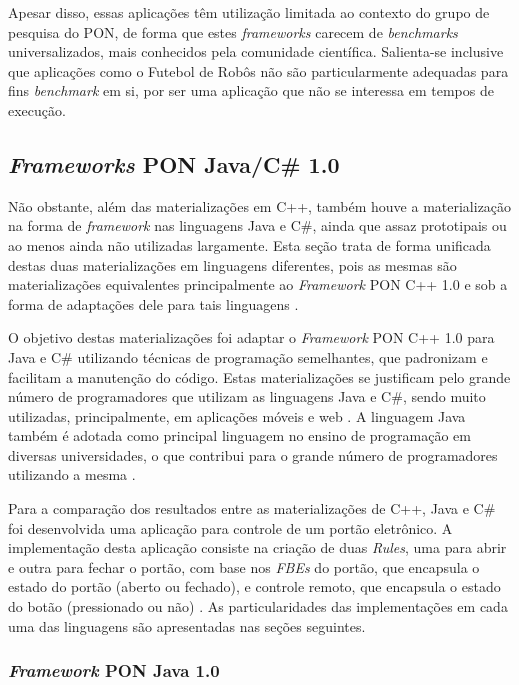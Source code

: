 Apesar disso, essas aplicações têm utilização limitada ao contexto do grupo de
pesquisa do PON, de forma que estes \textit{frameworks} carecem de
\textit{benchmarks} universalizados, mais conhecidos pela comunidade científica.
Salienta-se inclusive que aplicações como o Futebol de Robôs não são
particularmente adequadas para fins \textit{benchmark} em si, por ser uma
aplicação que não se interessa em tempos de execução.

\subsection{\textit{Frameworks} PON Java/C\# 1.0}\label{sec:csharp_java}

Não obstante, além das materializações em C++, também houve a materialização na
forma de \textit{framework} nas linguagens Java e C\#, ainda que assaz
prototipais ou ao menos ainda não utilizadas largamente. Esta seção trata de
forma unificada destas duas materializações em linguagens diferentes, pois as
mesmas são materializações equivalentes principalmente ao \textit{Framework} PON
C++ 1.0 e sob a forma de adaptações dele para tais linguagens
\cite{henzen_2015}.

O objetivo destas materializações foi adaptar o \textit{Framework} PON C++ 1.0
para Java e C\# utilizando técnicas de programação semelhantes, que padronizam e
facilitam a manutenção do código. Estas materializações se justificam pelo
grande número de programadores que utilizam as linguagens Java e C\#, sendo
muito utilizadas, principalmente, em aplicações móveis e web \cite{henzen_2015}.
A linguagem Java também é adotada como principal linguagem no ensino de
programação em diversas universidades, o que contribui para o grande número de
programadores utilizando a mesma \cite{henzen_2015}.

 Para a comparação dos resultados entre as materializações de C++, Java e C\#
foi desenvolvida uma aplicação para controle de um portão eletrônico. A
implementação desta aplicação consiste na criação de duas \textit{Rules}, uma
para abrir e outra para fechar o portão, com base nos \textit{FBEs} do portão,
que encapsula o estado do portão (aberto ou fechado), e controle remoto, que
encapsula o estado do botão (pressionado ou não) \cite{henzen_2015}. As
particularidades das implementações em cada uma das linguagens são apresentadas
nas seções seguintes.


\subsubsection{\textit{Framework} PON Java 1.0}\label{sec:java}

